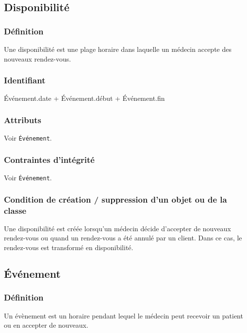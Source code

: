 \subsection{Disponibilité}

\subsubsection{Définition}

Une disponibilité est une plage horaire dans laquelle un médecin accepte
des nouveaux rendez-vous.

\subsubsection{Identifiant}

Événement.date + Événement.début + Événement.fin

\subsubsection{Attributs}

Voir \texttt{Événement}.

\subsubsection{Contraintes d'intégrité}

Voir \texttt{Événement}.

\subsubsection{Condition de création / suppression d'un objet ou de la classe}

Une disponibilité est créée lorsqu'un médecin décide d'accepter de nouveaux rendez-vous ou quand un
rendez-vous a été annulé par un client. Dans ce cas, le rendez-vous est transformé en disponibilité.

\subsection{Événement}

\subsubsection{Définition}

Un évènement est un horaire pendant lequel le médecin peut recevoir un patient ou en accepter de nouveaux.

